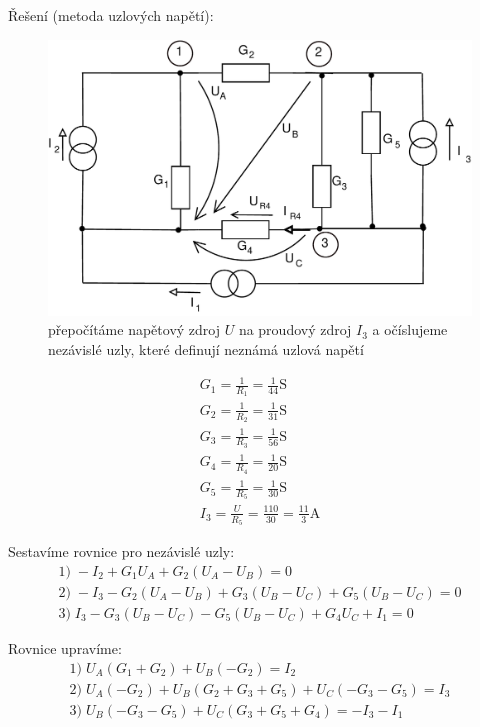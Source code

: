 \documentclass[12pt,a4paper]{article}
\begin{document}
	{\Large Řešení (metoda uzlových napětí):} \\

	\begin{figure}[H]
		\center\includegraphics[width=0.7\linewidth]{obr/3_2}
		\caption*{přepočítáme napětový zdroj $U$ na proudový zdroj $I_3$ a očíslujeme nezávislé uzly,
		které definují neznámá uzlová napětí}
	\end{figure}
	\begin{gather*}
		G_1 = \frac{1}{R_1} = \frac{1}{44} \text{S} \\
		G_2 = \frac{1}{R_2} = \frac{1}{31} \text{S} \\
		G_3 = \frac{1}{R_3} = \frac{1}{56} \text{S} \\
		G_4 = \frac{1}{R_4} = \frac{1}{20} \text{S} \\
		G_5 = \frac{1}{R_5} = \frac{1}{30} \text{S} \\
		I_3 = \frac{U}{R_5} = \frac{110}{30} = \frac{11}{3} \text{A}
	\end{gather*}

	Sestavíme rovnice pro nezávislé uzly:
	\begin{gather*}
		\text{1)} \; -I_2 + G_1 U_A + G_2 (U_A - U_B) = 0 \\
		\text{2)} \; -I_3 - G_2 (U_A - U_B) + G_3 (U_B - U_C) + G_5 (U_B - U_C) = 0 \\
		\text{3)} \; I_3 - G_3 (U_B - U_C) - G_5 (U_B - U_C) + G_4 U_C + I_1 = 0
	\end{gather*}

	Rovnice upravíme:
	\begin{gather*}
		\text{1)} \; U_A (G_1 + G_2) + U_B (-G_2) = I_2 \\
		\text{2)} \; U_A (-G_2) + U_B (G_2 + G_3 + G_5) + U_C (-G_3 - G_5) = I_3 \\
		\text{3)} \; U_B (-G_3 - G_5) + U_C (G_3 + G_5 + G_4) = -I_3 - I_1
	\end{gather*}
\end{document}
